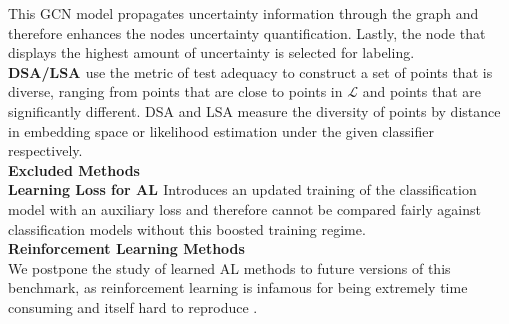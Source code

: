 \documentclass[]{article}
\newcommand{\LL}{\mathcal{L}}
\begin{document}
This GCN model propagates uncertainty information through the graph and therefore enhances the nodes uncertainty quantification. Lastly, the node that displays the highest amount of uncertainty is selected for labeling. \\
\textbf{DSA/LSA \cite{kim2019guiding}} use the metric of test adequacy to construct a set of points that is diverse, ranging from points that are close to points in $\LL$ and points that are significantly different. DSA and LSA measure the diversity of points by distance in embedding space or likelihood estimation under the given classifier respectively. \\ [2mm]
%
\textbf{Excluded Methods}\\
\textbf{Learning Loss for AL \cite{yoo2019learning}}
Introduces an updated training of the classification model with an auxiliary loss and therefore cannot be compared fairly against classification models without this boosted training regime.\\ [1mm]
%
\textbf{Reinforcement Learning Methods} \\
We postpone the study of learned AL methods to future versions of this benchmark, as reinforcement learning is infamous for being extremely time consuming and itself hard to reproduce .


\end{document}
